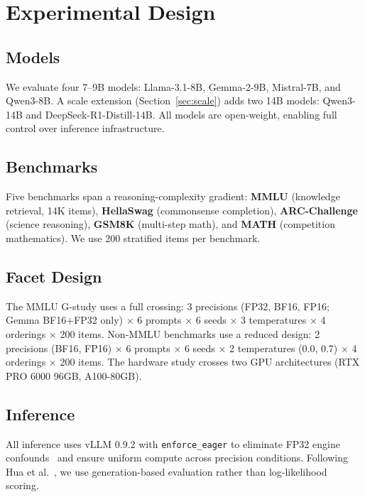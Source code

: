 \documentclass[11pt,a4paper]{article}
\begin{document}
\section{Experimental Design}

\subsection{Models}
We evaluate four 7--9B models: Llama-3.1-8B, Gemma-2-9B, Mistral-7B, and Qwen3-8B.
A scale extension (Section~\ref{sec:scale}) adds two 14B models: Qwen3-14B and DeepSeek-R1-Distill-14B.
All models are open-weight, enabling full control over inference infrastructure.

\subsection{Benchmarks}
Five benchmarks span a reasoning-complexity gradient:
\textbf{MMLU} (knowledge retrieval, 14K items),
\textbf{HellaSwag} (commonsense completion),
\textbf{ARC-Challenge} (science reasoning),
\textbf{GSM8K} (multi-step math), and
\textbf{MATH} (competition mathematics).
We use 200 stratified items per benchmark.

\subsection{Facet Design}
The MMLU G-study uses a full crossing: 3 precisions (FP32, BF16, FP16; Gemma BF16+FP32 only) $\times$ 6 prompts $\times$ 6 seeds $\times$ 3 temperatures $\times$ 4 orderings $\times$ 200 items.
Non-MMLU benchmarks use a reduced design: 2 precisions (BF16, FP16) $\times$ 6 prompts $\times$ 6 seeds $\times$ 2 temperatures (0.0, 0.7) $\times$ 4 orderings $\times$ 200 items.
The hardware study crosses two GPU architectures (RTX PRO 6000 96GB, A100-80GB).

\subsection{Inference}
All inference uses vLLM 0.9.2 with \texttt{enforce\_eager} to eliminate FP32 engine confounds~\citep{yuan2025} and ensure uniform compute across precision conditions.
Following Hua et al.~\citeyearpar{hua2025}, we use generation-based evaluation rather than log-likelihood scoring.
\end{document}
